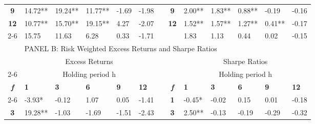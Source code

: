 \documentclass{article}
\begin{document}
\begin{table}[htbp!]
\begin{adjustwidth}{-1.25cm}{}
\begin{tabular}{rrrrrrrrrrrrr}
    \multicolumn{1}{c}{\textbf{9}} & \multicolumn{1}{l}{14.72**} & \multicolumn{1}{l}{19.24**} & \multicolumn{1}{l}{11.77**} & \multicolumn{1}{l}{-1.69} & \multicolumn{1}{l}{-1.98} &       & \multicolumn{1}{c}{\textbf{9}} & \multicolumn{1}{l}{2.00**} & \multicolumn{1}{l}{1.83**} & \multicolumn{1}{l}{0.88**} & \multicolumn{1}{l}{-0.19} & \multicolumn{1}{l}{-0.16} \\
    \multicolumn{1}{c}{\textbf{12}} & \multicolumn{1}{l}{10.77**} & \multicolumn{1}{l}{15.70**} & \multicolumn{1}{l}{19.15**} & \multicolumn{1}{l}{4.27} & \multicolumn{1}{l}{-2.07} &       & \multicolumn{1}{c}{\textbf{12}} & \multicolumn{1}{l}{1.52**} & \multicolumn{1}{l}{1.57**} & \multicolumn{1}{l}{1.27**} & \multicolumn{1}{l}{0.41**} & \multicolumn{1}{l}{-0.17} \\
\cmidrule{2-6}\cmidrule{9-13}    \multicolumn{1}{c}{\textbf{Avg}} & \multicolumn{1}{l}{15.75} & \multicolumn{1}{l}{11.63} & \multicolumn{1}{l}{6.28} & \multicolumn{1}{l}{0.33} & \multicolumn{1}{l}{-1.71} &       &       & \multicolumn{1}{l}{1.83} & \multicolumn{1}{l}{1.13} & \multicolumn{1}{l}{0.44} & \multicolumn{1}{l}{0.02} & \multicolumn{1}{l}{-0.15} \\
    \midrule
          & \multicolumn{12}{l}{PANEL B: Risk Weighted Excess Returns and Sharpe Ratios} \\
    \midrule
          & \multicolumn{5}{c}{Excess Returns}    &       &       & \multicolumn{5}{c}{Sharpe Ratios} \\
\cmidrule{2-6}\cmidrule{9-13}          & \multicolumn{5}{c}{Holding period h}  &       &       & \multicolumn{5}{c}{Holding period h} \\
    \multicolumn{1}{c}{\textit{\textbf{f}}} & \multicolumn{1}{l}{\textbf{1}} & \multicolumn{1}{l}{\textbf{3}} & \multicolumn{1}{l}{\textbf{6}} & \multicolumn{1}{l}{\textbf{9}} & \multicolumn{1}{l}{\textbf{12}} &       & \multicolumn{1}{c}{\textit{\textbf{f}}} & \multicolumn{1}{l}{\textbf{1}} & \multicolumn{1}{l}{\textbf{3}} & \multicolumn{1}{l}{\textbf{6}} & \multicolumn{1}{l}{\textbf{9}} & \multicolumn{1}{l}{\textbf{12}} \\
\cmidrule{2-6}\cmidrule{9-13}    \multicolumn{1}{c}{\textbf{1}} & \multicolumn{1}{l}{-3.93*} & \multicolumn{1}{l}{-0.12} & \multicolumn{1}{l}{1.07} & \multicolumn{1}{l}{0.05} & \multicolumn{1}{l}{-1.41} &       & \multicolumn{1}{c}{\textbf{1}} & \multicolumn{1}{l}{-0.45*} & \multicolumn{1}{l}{-0.02} & \multicolumn{1}{l}{0.15} & \multicolumn{1}{l}{0.01} & \multicolumn{1}{l}{-0.18} \\
    \multicolumn{1}{c}{\textbf{3}} & \multicolumn{1}{l}{19.28**} & \multicolumn{1}{l}{-1.03} & \multicolumn{1}{l}{-1.69} & \multicolumn{1}{l}{-1.51} & \multicolumn{1}{l}{-2.43} &       & \multicolumn{1}{c}{\textbf{3}} & \multicolumn{1}{l}{2.50**} & \multicolumn{1}{l}{-0.13} & \multicolumn{1}{l}{-0.19} & \multicolumn{1}{l}{-0.29} & \multicolumn{1}{l}{-0.32} \\

\end{tabular}
\end{adjustwidth}
\end{table}
\end{document}
